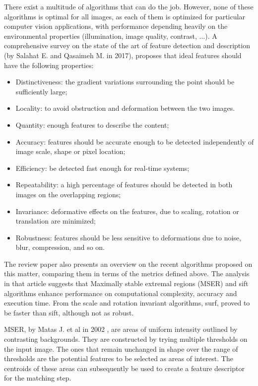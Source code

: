 There exist a multitude of algorithms that can do the job. However, none of these algorithms is optimal for all images, as each of them is optimized for particular computer vision applications, with performance depending heavily on the environmental properties (illumination, image quality, contrast, ...). A comprehensive survey on the state of the art of feature detection and description  \cite{featsift} (by Salahat E. and Qasaimeh M. in 2017), proposes that ideal features should have the following properties:
\begin{itemize}
	\item Distinctiveness: the gradient variations surrounding the point should be sufficiently large;
	\item Locality: to avoid obstruction and deformation between the two images.
	\item Quantity: enough features to describe the content;
	\item Accuracy: features should be accurate enough to be detected independently of image scale, shape or pixel location;
	\item Efficiency: be detected fast enough for real-time systems;
	\item Repeatability: a high percentage of features should be detected in both images on the overlapping regions;
	\item Invariance: deformative effects on the features, due to scaling, rotation or translation are minimized;
	\item Robustness: features should be less sensitive to deformations due to noise, blur, compression, and so on.
\end{itemize} 
The review paper also presents an overview on the recent algorithms proposed on this matter, comparing them in terms of the metrics defined above. The analysis in that article suggests that Maximally stable extremal regions (MSER) and \acrfull{sift} algorithms enhance performance on computational complexity, accuracy and execution time. From the scale and rotation invariant algorithms, \acrfull{surf}, proved to be faster than \acrshort{sift}, although not as robust.

MSER, by Matas J. et al in 2002 \cite{mser}, are areas of uniform intensity outlined by contrasting backgrounds. They are constructed by trying multiple thresholds on the input image. The ones that remain unchanged in shape over the range of thresholds are the potential features to be selected as areas of interest. The centroids of these areas can subsequently be used to create a feature descriptor for the matching step.

